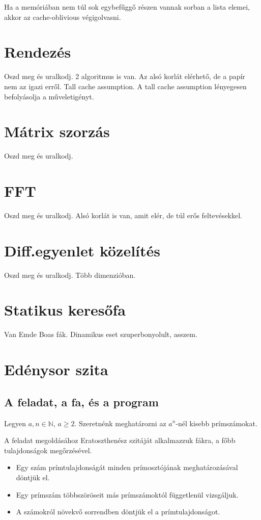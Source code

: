 \documentclass[12pt]{report}
\begin{document}
Ha a memóriában nem túl sok egybefűggő részen vannak sorban a lista elemei, akkor az cache-oblivious végigolvasni.

\section{Rendezés}

Oszd meg és uralkodj. 2 algoritmus is van. Az alsó korlát elérhető, de a papír nem az igazi erről. Tall cache assumption. A tall cache assumption lényegesen befolyásolja a műveletigényt.

\section{Mátrix szorzás}

Oszd meg és uralkodj.

\section{FFT}

Oszd meg és uralkodj. Alsó korlát is van, amit elér, de túl erős feltevésekkel.

\section{Diff.egyenlet közelítés}

Oszd meg és uralkodj. Több dimenzióban.

\section{Statikus keresőfa}

Van Emde Boas fák. Dinamikus eset szuperbonyolult, asszem.

\section{Edénysor szita}

\subsection{A feladat, a fa, és a program}

Legyen $a, n \in \mathbb{N}$, $a \ge 2$.
Szeretnénk meghatározni az $a^n$-nél kisebb prímszámokat.

A feladat megoldásához Eratoszthenész szitáját alkalmazzuk fákra, a főbb tulajdonságok megőrzésével.
\begin{itemize}
\item Egy szám prímtulajdonságát minden prímosztójának meghatározásával döntjük el.
\item Egy prímszám többszöröseit más prímszámoktól függetlenül vizsgáljuk.
\item A számokról növekvő sorrendben döntjük el a prímtulajdonságot.
\end{itemize}
\end{document}
